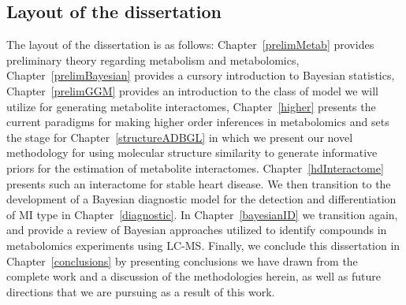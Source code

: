 \begin{DoubleSpace*}
\section{Layout of the dissertation}
The layout of the dissertation is as follows: Chapter~\ref{prelimMetab} provides preliminary theory regarding metabolism and metabolomics, Chapter~\ref{prelimBayesian} provides a cursory introduction to Bayesian statistics, Chapter~\ref{prelimGGM} provides an introduction to the class of model we will utilize for generating metabolite interactomes, Chapter~\ref{higher} presents the current paradigms for making higher order inferences in metabolomics and sets the stage for Chapter~\ref{structureADBGL} in which we present our novel methodology for using molecular structure similarity to generate informative priors for the estimation of metabolite interactomes. Chapter~\ref{hdInteractome} presents such an interactome for stable heart disease. We then transition to the development of a Bayesian diagnostic model for the detection and differentiation of MI type in Chapter~\ref{diagnostic}. In Chapter~\ref{bayesianID} we transition again, and provide a review of Bayesian approaches utilized to identify compounds in metabolomics experiments using LC-MS. Finally, we conclude this dissertation in Chapter~\ref{conclusions} by presenting conclusions we have drawn from the complete work and a discussion of the methodologies herein, as well as future directions that we are pursuing as a result of this work.

\end{DoubleSpace*}